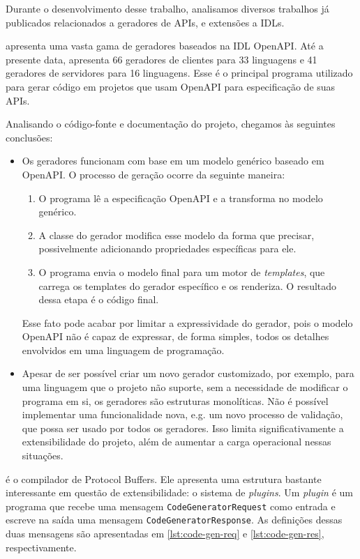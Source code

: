 
Durante o desenvolvimento desse trabalho, analisamos diversos trabalhos já publicados
relacionados a geradores de APIs, e extensões a IDLs.

\cite{openapi:gen} apresenta uma vasta gama de geradores baseados na IDL OpenAPI. Até
a presente data, apresenta 66 geradores de clientes para 33 linguagens e 41 geradores
de servidores para 16 linguagens. Esse é o principal programa utilizado para gerar
código em projetos que usam OpenAPI para especificação de suas APIs.

Analisando o código-fonte e documentação do projeto, chegamos às seguintes conclusões:

\begin{itemize}
\item
  Os geradores funcionam com base em um modelo genérico baseado em OpenAPI. O processo
  de geração ocorre da seguinte maneira:

  \begin{enumerate}
  \item
    O programa lê a especificação OpenAPI e a transforma no modelo genérico.
  \item
    A classe do gerador modifica esse modelo da forma que precisar, possivelmente
    adicionando propriedades específicas para ele.
  \item
    O programa envia o modelo final para um motor de \textit{templates}, que
    carrega os templates do gerador específico e os renderiza. O resultado dessa
    etapa é o código final.
  \end{enumerate}

  Esse fato pode acabar por limitar a expressividade do gerador, pois o modelo
  OpenAPI não é capaz de expressar, de forma simples, todos os detalhes envolvidos
  em uma linguagem de programação.
\item
  Apesar de ser possível criar um novo gerador customizado, por exemplo, para uma
  linguagem que o projeto não suporte, sem a necessidade de modificar o programa
  em si, os geradores são estruturas monolíticas. Não é possível implementar uma
  funcionalidade nova, e.g. um novo processo de validação, que possa ser usado por
  todos os geradores. Isso limita significativamente a extensibilidade do projeto,
  além de aumentar a carga operacional nessas situações.
\end{itemize}

\cite{googl:protobuf} é o compilador de Protocol Buffers. Ele apresenta uma estrutura
bastante interessante em questão de extensibilidade: o sistema de \textit{plugins}.
Um \textit{plugin} é um programa que recebe uma mensagem \texttt{CodeGeneratorRequest}
como entrada e escreve na saída uma mensagem \texttt{CodeGeneratorResponse}. As
definições dessas duas mensagens são apresentadas em \cref{lst:code-gen-req} e
\cref{lst:code-gen-res}, respectivamente.

